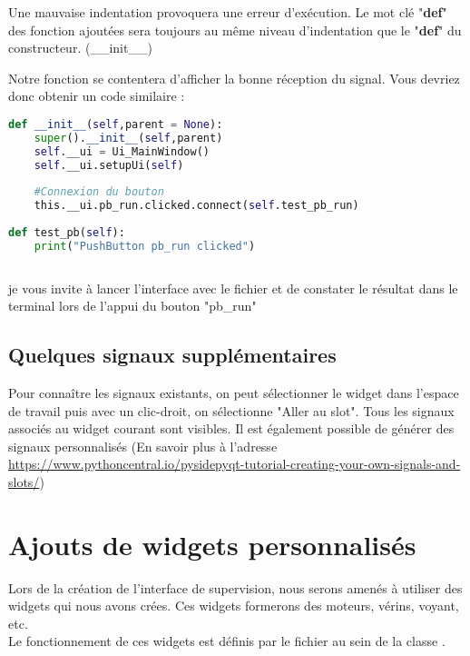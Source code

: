 Une mauvaise indentation provoquera une erreur d'exécution. 
Le mot clé "\textbf{def}" des fonction ajoutées sera toujours au même niveau d'indentation que le "\textbf{def}" du constructeur. (\_\_init\_\_)\newline

Notre fonction  se contentera d'afficher la bonne réception du signal. Vous devriez donc obtenir un code similaire : \newline

\begin{lstlisting}[language=Python]
def __init__(self,parent = None):
    super().__init__(self,parent)
    self.__ui = Ui_MainWindow()
    self.__ui.setupUi(self)
    
    #Connexion du bouton
    this.__ui.pb_run.clicked.connect(self.test_pb_run)
        
def test_pb(self):
    print("PushButton pb_run clicked")
        
\end{lstlisting}

je vous invite à lancer l'interface avec le fichier  et de constater le résultat dans le terminal lors de l'appui du bouton "pb\_run"
\section{Quelques signaux supplémentaires}

Pour connaître les signaux existants, on peut sélectionner le widget dans l'espace de travail puis avec un clic-droit, on sélectionne "Aller au slot". \newline
Tous les signaux associés au widget courant sont visibles.
Il est également possible de générer des signaux personnalisés (En savoir plus à l'adresse \url{https://www.pythoncentral.io/pysidepyqt-tutorial-creating-your-own-signals-and-slots/})



\chapter{Ajouts de widgets personnalisés}

Lors de la création de l'interface de supervision, nous serons amenés à utiliser des widgets qui nous avons crées. \newline
Ces widgets formerons des moteurs, vérins, voyant, etc. \\
Le fonctionnement de ces widgets est définis par le fichier  au sein de la classe .

